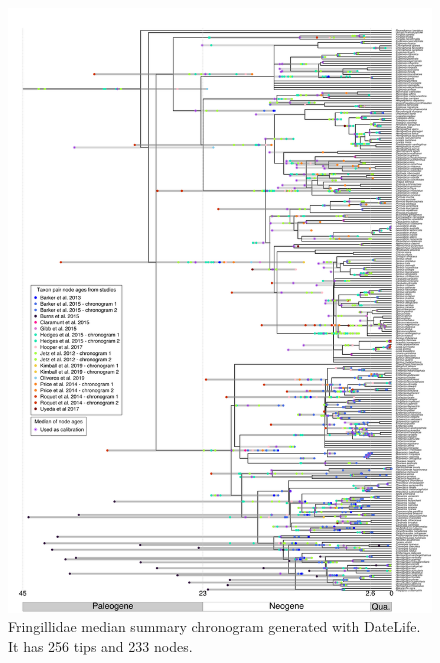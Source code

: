 \documentclass[
  english,
  man]{apa6}
\begin{document}
\begin{figure}[!h]
\includegraphics{../figures/figure-fringillidae/median_and_calibration_ages_simple.png}
\caption{Fringillidae median summary chronogram generated with DateLife. It has 256 tips and 233 nodes.}
\label{fig:fringillidages}
\end{figure}

\end{document}
